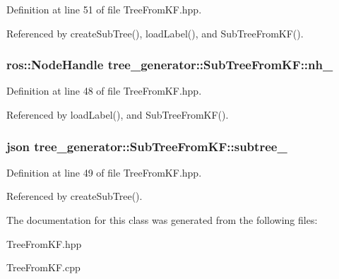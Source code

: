 Definition at line 51 of file Tree\-From\-K\-F.\-hpp.



Referenced by create\-Sub\-Tree(), load\-Label(), and Sub\-Tree\-From\-K\-F().

\hypertarget{classtree__generator_1_1SubTreeFromKF_af32fafef64d1f98df5b38697d1984d80_af32fafef64d1f98df5b38697d1984d80}{
\subsubsection[{nh\-\_\-}]{\setlength{\rightskip}{0pt plus 5cm}ros\-::\-Node\-Handle tree\-\_\-generator\-::\-Sub\-Tree\-From\-K\-F\-::nh\-\_\-\hspace{0.3cm}{\ttfamily [private]}}}\label{classtree__generator_1_1SubTreeFromKF_af32fafef64d1f98df5b38697d1984d80_af32fafef64d1f98df5b38697d1984d80}


Definition at line 48 of file Tree\-From\-K\-F.\-hpp.



Referenced by load\-Label(), and Sub\-Tree\-From\-K\-F().

\hypertarget{classtree__generator_1_1SubTreeFromKF_a2c9edbe4a6243a1a8bad6ae524df884b_a2c9edbe4a6243a1a8bad6ae524df884b}{
\subsubsection[{subtree\-\_\-}]{\setlength{\rightskip}{0pt plus 5cm}json tree\-\_\-generator\-::\-Sub\-Tree\-From\-K\-F\-::subtree\-\_\-\hspace{0.3cm}{\ttfamily [private]}}}\label{classtree__generator_1_1SubTreeFromKF_a2c9edbe4a6243a1a8bad6ae524df884b_a2c9edbe4a6243a1a8bad6ae524df884b}


Definition at line 49 of file Tree\-From\-K\-F.\-hpp.



Referenced by create\-Sub\-Tree().



The documentation for this class was generated from the following files\-:\begin{DoxyCompactItemize}
\item 
Tree\-From\-K\-F.\-hpp\item 
Tree\-From\-K\-F.\-cpp\end{DoxyCompactItemize}

